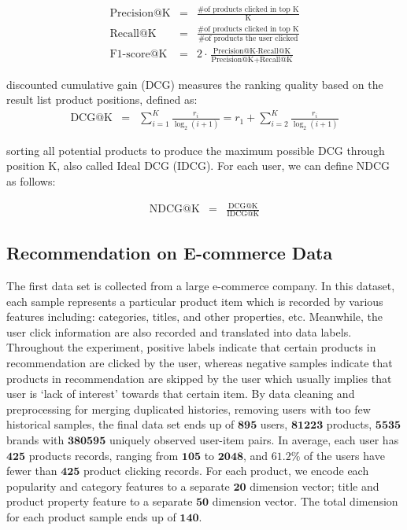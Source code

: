 \begin{eqnarray}
\text{Precision@K} & = & \frac{\text{\# of products clicked in top K}}{\text{K}} \nonumber \\
\text{Recall@K}      & = & \frac{\text{\# of products clicked in top K}}{\text{\# of products the user clicked}} \nonumber \\
\text{F1-score@K} & = & 2\cdot\frac{\text{Precision@K} \cdot \text{Recall@K}}{\text{Precision@K} + \text{Recall@K}}  \nonumber
\end{eqnarray}

discounted cumulative gain (DCG) measures the ranking quality based on the result list product positions, defined as:
\begin{eqnarray}
\text{DCG@K} & = & \sum_{i=1}^K\frac{r_i}{\log_2(i+1)} =  r_1 + \sum_{i=2}^K\frac{r_i}{\log_2(i+1)}\nonumber
\end{eqnarray}

sorting all potential products to produce the maximum possible DCG through position K, also called Ideal DCG (IDCG).  For each user, we can define NDCG as follows:

\begin{eqnarray}
\text{NDCG@K} & = & \frac{\text{DCG@K}}{\text{IDCG@K}}\nonumber
\end{eqnarray}

\subsection{Recommendation on E-commerce Data}
The first data set is collected from a large e-commerce company.  In this dataset, each sample represents a particular product item which is recorded by various features including: categories, titles, and other properties, etc.  Meanwhile, the user click information are also recorded and translated into data labels. Throughout the experiment, positive labels indicate that certain products in recommendation are clicked by the user, whereas negative samples indicate that products in recommendation are skipped by the user which usually implies that user is `lack of interest' towards that certain item.  By data cleaning and preprocessing for merging duplicated histories, removing users with too few historical samples, the final data set ends up of $\mathbf{895}$ users, $\mathbf{81223}$ products, $\mathbf{5535}$ brands with $\mathbf{380595}$ uniquely observed user-item pairs.  In average, each user has $\mathbf{425}$ products records, ranging from $\mathbf{105}$ to $\mathbf{2048}$, and $\mathbf{61.2\%}$ of the users have fewer than $\mathbf{425}$ product clicking records.  For each product, we encode each popularity and category features to a separate $\mathbf{20}$ dimension vector; title and product property feature to a separate $\mathbf{50}$ dimension vector.   The total dimension for each product sample ends up of $\mathbf{140}$.

